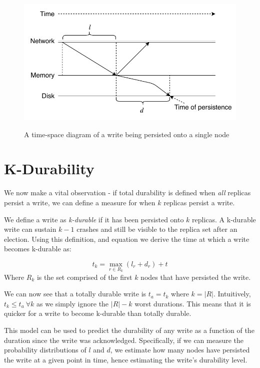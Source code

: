 \begin{figure}
    \centering
    \includegraphics[width=\textwidth]{images/write.pdf}
    \label{fig:write}
    \caption{A time-space diagram of a write being persisted onto a single node}
\end{figure}

\section{K-Durability}

We now make a vital observation - if total durability is defined when \textit{all} replicas persist a write, we can define a measure for when $k$ replicas persist a write. 

We define a write as \textit{k-durable} if it has been persisted onto $k$ replicas. A k-durable write can sustain $k-1$ crashes and still be visible to the replica set after an election. Using this definition, and equation  we derive the time at which a write becomes k-durable as: 
\begin{center}
\begin{equation} \label{eq:tk}
t_k = \max_{r \in R_k}(l_r + d_r) + t
\end{equation}
Where $R_k$ is the set comprised of the first $k$ nodes that have persisted the write.
\end{center}

We can now see that a totally durable write is $t_a = t_k$ where $k = |R|$. Intuitively, $t_k \leq t_a \ \forall k$ as we simply ignore the $|R| - k$ worst durations. This means that it is quicker for a write to become k-durable than totally durable.

This model can be used to predict the durability of any write as a function of the duration since the write was acknowledged. Specifically, if we can measure the probability distributions of $l$ and $d$, we estimate how many nodes have persisted the write at a given point in time, hence estimating the write's durability level.

